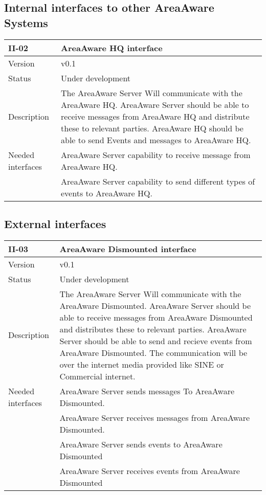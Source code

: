 \subsection{Internal interfaces to other AreaAware Systems}
\begin{longtable}{| p{3.5cm} |  p{10cm} | }
	\hline
	\textbf{II-02} &  \textbf{AreaAware HQ interface } \\
	\hline
	Version & v0.1 \\
	\hline
	Status & Under development \\
	\hline
	Description & The AreaAware Server Will communicate with the AreaAware HQ. AreaAware Server should be able to receive messages from AreaAware HQ and distribute these to relevant parties. AreaAware HQ should be able to send Events and messages to AreaAware HQ.\\
	\hline
	Needed interfaces & AreaAware Server capability to receive message from AreaAware HQ.\\
	& AreaAware Server capability to send different types of events to AreaAware HQ.\\
	\hline
\end{longtable}

\subsection{External interfaces}
\begin{longtable}{| p{3.5cm} |  p{10cm} | }
	\hline
	\textbf{II-03} &  \textbf{AreaAware Dismounted interface } \\
	\hline
	Version & v0.1 \\
	\hline
	Status & Under development \\
	\hline
	Description & The AreaAware Server Will communicate with the AreaAware Dismounted. AreaAware Server should be able to receive messages from AreaAware Dismounted and distributes these to relevant parties. AreaAware Server should be able to send and recieve events from AreaAware Dismounted. The communication will be over the internet media provided like SINE or Commercial internet.
	\\
	\hline
	Needed interfaces & AreaAware Server sends messages To AreaAware Dismounted.  \\
	& AreaAware Server receives messages from AreaAware Dismounted. \\
	& AreaAware Server sends events to AreaAware Dismounted  \\
	& AreaAware Server receives events from AreaAware Dismounted  \\
	\hline
\end{longtable}


